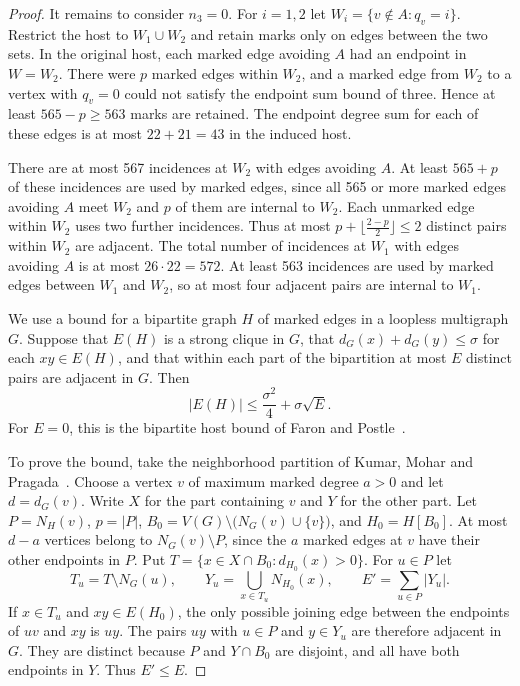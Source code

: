 \documentclass[preprint,11pt,numbers]{elsarticle-arxiv}
\numberwithin{equation}{section}
\theoremstyle{definition}
\begin{document}
\begin{proof}
It remains to consider $n_3=0$. For $i=1,2$ let
$W_i=\{v\notin A:q_v=i\}$. Restrict the host to $W_1\cup W_2$
and retain marks only on edges between the two sets. In the
original host, each marked edge avoiding $A$ had an endpoint
in $W=W_2$. There were $p$ marked edges within $W_2$, and a
marked edge from $W_2$ to a vertex with $q_v=0$ could not satisfy
the endpoint sum bound of three. Hence at least $565-p\geq563$
marks are retained. The endpoint degree sum for each of these
edges is at most $22+21=43$ in the induced host.

There are at most 567 incidences at $W_2$ with edges avoiding
$A$. At least $565+p$ of these incidences are used by marked
edges, since all 565 or more marked edges avoiding $A$ meet
$W_2$ and $p$ of them are internal to $W_2$. Each unmarked
edge within $W_2$ uses two further incidences. Thus at most
$p+\lfloor\frac{2-p}{2}\rfloor\leq2$ distinct pairs within $W_2$
are adjacent. The total number of incidences at $W_1$ with
edges avoiding $A$ is at most $26\cdot22=572$. At least 563
incidences are used by marked edges between $W_1$ and $W_2$,
so at most four adjacent pairs are internal to $W_1$.

We use a bound for a bipartite graph $H$ of marked edges
in a loopless multigraph $G$. Suppose that $E(H)$ is a strong
clique in $G$, that $d_G(x)+d_G(y)\leq\sigma$ for each
$xy\in E(H)$, and that within each part of the bipartition
at most $E$ distinct pairs are adjacent in $G$. Then
\[
 |E(H)|\leq\frac{\sigma^2}{4}+\sigma\sqrt{E}.
\]
For $E=0$, this is the bipartite host bound of Faron and
Postle~\cite{FaronPostle2019}.

To prove the bound, take the neighborhood partition of
Kumar, Mohar and Pragada~\cite{KumarMoharPragada2026}.
Choose a vertex $v$ of maximum marked degree $a>0$ and let
$d=d_G(v)$. Write $X$ for the part containing $v$ and $Y$
for the other part. Let $P=N_H(v)$, $p=|P|$,
$B_0=V(G)\setminus\bigl(N_G(v)\cup\{v\}\bigr)$, and
$H_0=H[B_0]$. At most $d-a$ vertices belong to $N_G(v)\setminus P$,
since the $a$ marked edges at $v$ have their other endpoints in
$P$. Put $T=\{x\in X\cap B_0:d_{H_0}(x)>0\}$. For $u\in P$ let
\[
 T_u=T\setminus N_G(u),\qquad
 Y_u=\bigcup_{x\in T_u}N_{H_0}(x),\qquad
 E'=\sum_{u\in P}|Y_u|.
\]
If $x\in T_u$ and $xy\in E(H_0)$, the only possible
joining edge between the endpoints of $uv$ and $xy$ is $uy$.
The pairs $uy$ with $u\in P$ and $y\in Y_u$ are therefore adjacent
in $G$. They are distinct because $P$ and $Y\cap B_0$ are disjoint,
and all have both endpoints in $Y$. Thus $E'\leq E$.


\end{proof}
\end{document}
